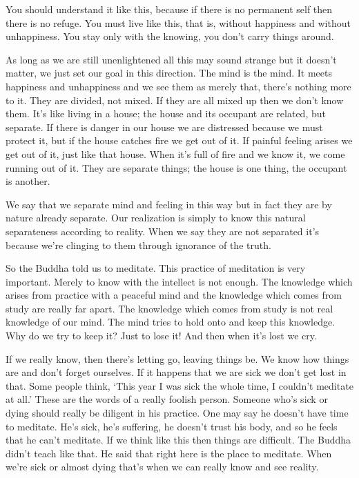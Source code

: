 You should understand it like this, because if there is no permanent self then there is no refuge. You must live like this, that is, without happiness and without unhappiness. You stay only with the knowing, you don't carry things around.

As long as we are still unenlightened all this may sound strange but it doesn't matter, we just set our goal in this direction. The mind is the mind. It meets happiness and unhappiness and we see them as merely that, there's nothing more to it. They are divided, not mixed. If they are all mixed up then we don't know them. It's like living in a house; the house and its occupant are related, but separate. If there is danger in our house we are distressed because we must protect it, but if the house catches fire we get out of it. If painful feeling arises we get out of it, just like that house. When it's full of fire and we know it, we come running out of it. They are separate things; the house is one thing, the occupant is another.

We say that we separate mind and feeling in this way but in fact they are by nature already separate. Our realization is simply to know this natural separateness according to reality. When we say they are not separated it's because we're clinging to them through ignorance of the truth.

So the Buddha told us to meditate. This practice of meditation is very important. Merely to know with the intellect is not enough. The knowledge which arises from practice with a peaceful mind and the knowledge which comes from study are really far apart. The knowledge which comes from study is not real knowledge of our mind. The mind tries to hold onto and keep this knowledge. Why do we try to keep it? Just to lose it! And then when it's lost we cry.

If we really know, then there's letting go, leaving things be. We know how things are and don't forget ourselves. If it happens that we are sick we don't get lost in that. Some people think, `This year I was sick the whole time, I couldn't meditate at all.' These are the words of a really foolish person. Someone who's sick or dying should really be diligent in his practice. One may say he doesn't have time to meditate. He's sick, he's suffering, he doesn't trust his body, and so he feels that he can't meditate. If we think like this then things are difficult. The Buddha didn't teach like that. He said that right here is the place to meditate. When we're sick or almost dying that's when we can really know and see reality.

